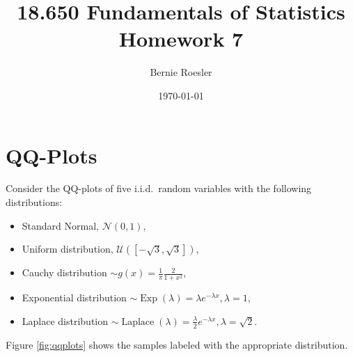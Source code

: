 \documentclass[letterpaper, oneside]{amsart}
\title[Homework 7 -- Problem \thesection]{18.650 Fundamentals of Statistics\\{\large Homework 7}}
\author{Bernie Roesler}
\date{\today}
\renewcommand{\(}{\left(}
\renewcommand{\)}{\right)}
\renewcommand{\[}{\left[}
\renewcommand{\]}{\right]}
\newcommand{\N}[2]{\mathcal{N}\left( #1, #2 \right)}
\newcommand{\U}[2]{\mathcal{U}\left(\left[ #1, #2 \right]\right)}
\newcommand{\iid}{i.i.d.\ }
\begin{document}

\graphicspath{{./figures/}}

\maketitle

\section{QQ-Plots}
Consider the QQ-plots of five \iid random variables with the following
distributions:
\begin{itemize}
\item Standard Normal, $\N{0}{1}$,
  \item Uniform distribution, $\U{-\sqrt{3}}{\sqrt{3}}$,
  \item Cauchy distribution $\sim g(x) = \frac{1}{\pi}\frac{2}{1+x^2}$,
  \item Exponential distribution $\sim \operatorname{Exp}(\lambda) = \lambda
    e^{-\lambda x}, \lambda = 1$,
  \item Laplace distribution $\sim \operatorname{Laplace}(\lambda)
    = \frac{\lambda}{2} e^{-\lambda x}, \lambda = \sqrt{2}$.
\end{itemize}
Figure \ref{fig:qqplots} shows the samples labeled with the appropriate
distribution.


% 

% 
% 

%
%
% 
%
\end{document}
